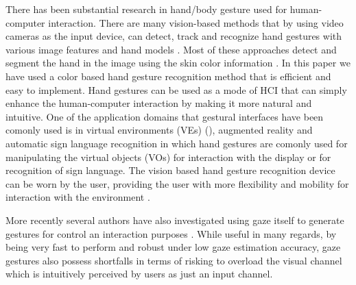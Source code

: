 \documentclass[jou,a4paper,notxfonts]{apa}
\begin{document}
 There has been substantial research in hand/body gesture used for human-computer interaction. There are many vision-based methods that by using video cameras as the input device, can detect, track and recognize hand gestures with various image features and hand models \cite{surveygesturerecognition}. Most of these approaches detect and segment the hand in the image using the skin color information \cite{argyros2004real}. In this paper we have used a color based hand gesture recognition method that is efficient and easy to implement.
 Hand gestures can be used as a mode of HCI that can simply enhance the human-computer interaction by making it more natural and intuitive. One of the application domains that gestural interfaces have been comonly used is in virtual environments (VEs) (\cite{adam1993virtual, krueger1991artificial}), augmented reality \cite{buchmann2004fingartips} and automatic sign language recognition \cite{Rozado2012b,myicann2010} in which hand gestures are comonly used for manipulating the virtual objects (VOs) for interaction with the display or for recognition of sign language.
The vision based hand gesture recognition device can be worn by the user, providing the user with more flexibility and mobility for interaction with the environment \cite{starner2000gesture,amento2002sound}.

More recently several authors have also investigated using gaze itself to generate gestures for control an interaction purposes \cite{istance, Rozado2012a, drewessecurity, myiwann2011, emilieetra, interactingWithComputerUsingGazeGestures}. While useful in many regards, by being very fast to perform and robust under low gaze estimation accuracy, gaze gestures also possess shortfalls in terms of risking to overload the visual channel which is intuitively perceived by users as just an input channel.
\end{document}
